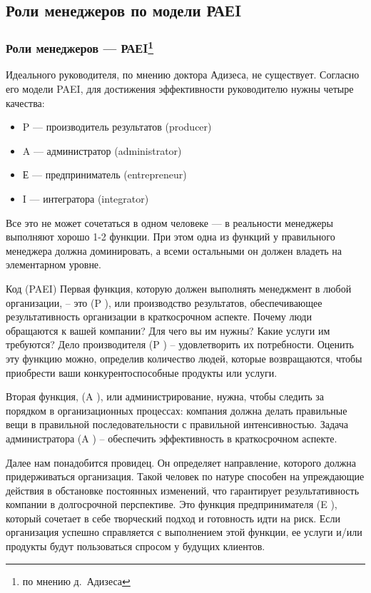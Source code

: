 \documentclass{../industrial-development}
\begin{document}
\subsection{Роли менеджеров по модели РАЕI}

\begin{frame} \frametitle{Роли менеджеров — РАЕI\footnote[2]{по мнению д.~Адизеса}}
	Идеального руководителя, по мнению доктора Адизеса, не существует. Согласно его модели PAEI, для достижения эффективности руководителю нужны четыре качества: 
 \begin{itemize}
	 \item \alert{P} — производитель результатов (producer) 
	 \item \alert{A} — администратор (administrator) 
	 \item \alert{Е} — предприниматель (entrepreneur) 
	 \item \alert{I} — интегратора (integrator)
 \end{itemize}
Все это не может сочетаться в одном человеке — в реальности менеджеры выполняют хорошо 1-2 функции. При этом одна из функций у правильного менеджера должна доминировать, а всеми остальными он должен владеть на элементарном уровне.  \\

\end{frame}
\lecturenotes
Код (PAEI) 
Первая функция, которую должен выполнять менеджмент в любой организации, – это (P ), или производство результатов, обеспечивающее результативность организации в краткосрочном аспекте. Почему люди обращаются к вашей компании? Для чего вы им нужны? Какие услуги им требуются? Дело производителя (P ) – удовлетворить их потребности. Оценить эту функцию можно, определив количество людей, которые возвращаются, чтобы приобрести ваши конкурентоспособные продукты или услуги.

Вторая функция, (A ), или администрирование, нужна, чтобы следить за порядком в организационных процессах: компания должна делать правильные вещи в правильной
последовательности с правильной интенсивностью. Задача администратора (A ) – обеспечить
эффективность в краткосрочном аспекте.

Далее нам понадобится провидец. Он определяет направление, которого должна придерживаться организация. Такой человек по натуре способен на упреждающие действия в обстановке постоянных изменений, что гарантирует результативность компании в долгосрочной перспективе. Это функция предпринимателя (E ), который сочетает в себе творческий подход и готовность идти на риск. Если организация успешно справляется с выполнением этой функции, ее услуги и/или продукты будут пользоваться спросом у будущих клиентов.
\end{document}

